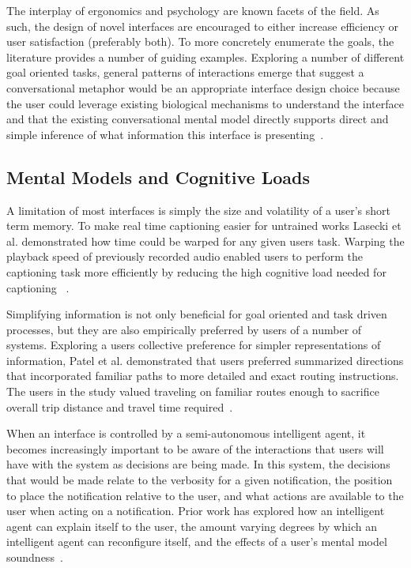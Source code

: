 The interplay of ergonomics and psychology are known facets of the field. As
such, the design of novel interfaces are encouraged to either increase
efficiency or user satisfaction (preferably both). To more concretely enumerate
the goals, the literature provides a number of guiding examples.  Exploring a
number of different goal oriented tasks, general patterns of interactions emerge
that suggest a conversational metaphor would be an appropriate interface design
choice because the user could leverage existing biological mechanisms to
understand the interface and that the existing conversational mental model
directly supports direct and simple inference of what information this
interface is presenting~\cite{kieras1984role}.

\subsection{                  Mental Models and Cognitive Loads              }

A limitation of most interfaces is simply the size and volatility of a user's
short term memory.  To make real time captioning easier for untrained works
Lasecki et al. demonstrated how time could be warped for any given users task.
Warping the playback speed of previously recorded audio enabled users to perform
the captioning task more efficiently by reducing the high cognitive load needed
for captioning ~\cite{lasecki2013warping}.

Simplifying information is not only beneficial for goal oriented and task driven
processes, but they are also empirically preferred by users of a number of
systems. Exploring a users collective preference for simpler  representations of
information, Patel et al. demonstrated that users preferred summarized
directions that incorporated familiar paths to more detailed and exact routing
instructions. The users in the study valued traveling on  familiar routes enough
to sacrifice overall trip distance and travel time
required~\cite{patel2006personalizing}.

When an interface is controlled by a semi-autonomous intelligent agent, it
becomes increasingly important to be aware of the interactions that users will
have with the system as decisions are being made.  In this system, the
decisions that would be made relate to the verbosity for a given notification,
the position to place the notification relative to the user, and what actions
are available to the user when acting on a notification.  Prior work has
explored how an intelligent agent can explain itself to the user, the amount
varying degrees by which an intelligent agent can reconfigure itself, and the
effects of a user's mental model soundness~\cite{kulesza2012tell}.

